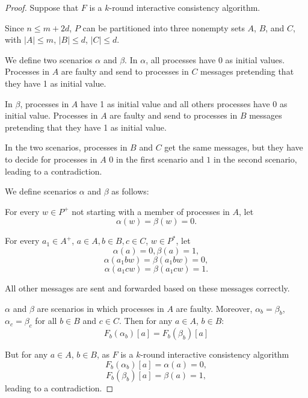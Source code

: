 \begin{proof}
  Suppose that $F$ is a $k$-round  interactive consistency algorithm. 
  
  Since $n \leqslant
  m+2d$, $P$ can be partitioned into three nonempty sets $A$, $B$, and $C$,
  with $| A | \leqslant m$, $| B | \leqslant d$, $| C | \leqslant d$. 
  
   We define two scenarios $\alpha$ and $\beta$.
  In $\alpha$, all processes have 0 as initial values.
  Processes in $A$ are faulty and send  to processes in $C$  messages
  pretending that they have  1 as initial value. 
  
   In $\beta$, processes in $A$ have 1 as initial value and all  others processes have 0 as initial value.
  Processes in $A$ are faulty and send to processes in $B$ messages 
  pretending that they have 1 as initial value.
  

  In the two scenarios, processes in $B$ and $C$  get the same messages, but they have to decide for processes in $A$ $0$ in the first scenario 
  and $1$ in the second scenario, leading to a contradiction.
  
  We
  define scenarios $\alpha$ and $\beta$ as follows:
  \begin{enumerateroman}
    \item For every $w \in P^{+}$ not starting with a member of processes in $A$, let
    \[ \alpha ( w ) = \beta ( w ) =0. \]
    \item For every $a_{1}  \in A^{+}$, $a \in A,b \in B,c
    \in C$, $w \in P^{\ast}$, let
    \[ \alpha ( a ) =0, \beta ( a ) =1, \]
    \[ \alpha ( a_{1}  b w ) = \beta ( a_{1}  b w ) =0, \]
    \[ \alpha ( a_{1}  c w ) = \beta ( a_{1}  c w ) =1. \]
    \item All other messages are sent and forwarded based on these messages
    correctly.
  \end{enumerateroman}
  
  $\alpha$ and $\beta$ are scenarios in which processes in $A$ are faulty.
  Moreover, $\alpha_{b} =
  \beta_{b}$, $\alpha_{c} = \beta_{c}$ for all $b \in B$ and $c \in C$. 
  Then for any $a \in A$, $b \in B$:
   \[ F_b ( \alpha_{b} )[a] =F_b ( \beta_{b} )[a]  \]

  
But for any $a \in A$, $b \in B$, as $F$ is a $k$-round  interactive consistency algorithm
  \[ F_b ( \alpha_{b} )[a] = \alpha ( a )
     =0, \]
       \[ F_b ( \beta_{b} )[a] = \beta ( a )
     =1, \]
  leading to a contradiction.
\end{proof}

